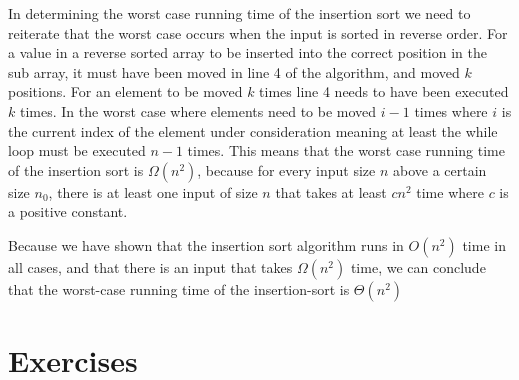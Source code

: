 \documentclass[12pt letter]{report}
\begin{document}
In determining the worst case running time of the insertion sort we need to reiterate that the worst case occurs when
the input is sorted in reverse order. For a value in a reverse sorted array to be inserted into the correct position in
the sub array, it must have been moved in line 4 of the algorithm, and moved $k$ positions. For an element to be moved
$k$ times line 4 needs to have been executed $k$ times. In the worst case where elements need to be moved $i-1$ times
where $i$ is the current index of the element under consideration meaning at least the while loop must be executed $n-1$
times. This means that the worst case running time of the insertion sort is $\Omega \left( n^2 \right) $, because for
every input size $n$ above a certain size $n_0$, there is at least one input of size $n$ that takes at least $cn^2$ time
where $c$ is a positive constant.

Because we have shown that the insertion sort algorithm runs in $O \left( n^2 \right) $ time in all cases, and that
there is an input that takes $\Omega \left( n^2 \right) $ time, we can conclude that the worst-case running time of the
insertion-sort is $\Theta \left( n^2 \right) $

\section{Exercises}




\end{document}
